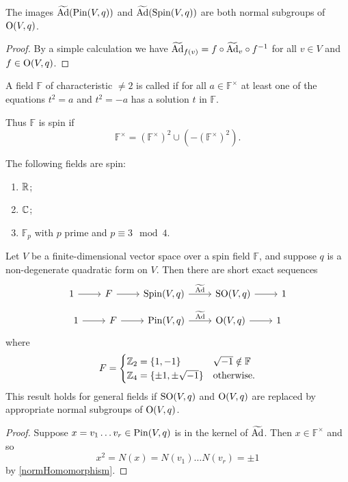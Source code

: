 \begin{proposition}
The images $\widetilde{\operatorname{Ad}}(\operatorname{Pin}(V,q))$ and $\widetilde{\operatorname{Ad}}(\operatorname{Spin}(V,q))$ are both normal subgroups of $\operatorname{O}(V,q)$.
\end{proposition}
\begin{proof}
By a simple calculation we have $\widetilde{\operatorname{Ad}}_{f(v)} = f\circ\widetilde{\operatorname{Ad}}_v\circ f^{-1}$ for all $v \in V$ and $f\in\operatorname{O}(V,q)$.
\end{proof}

\begin{definition}
A field $\mathbb{F}$ of characteristic $\neq 2$ is called  if for all $a\in \mathbb{F}^\times$ at least one of the equations $t^2 = a$ and $t^2 = -a$ has a solution $t$ in $\mathbb{F}$.
\end{definition}
Thus $\mathbb{F}$ is spin if
\[ \mathbb{F}^\times = (\mathbb{F}^\times)^2 \cup (-(\mathbb{F}^\times)^2). \]

\begin{lemma}
The following fields are spin:
\begin{enumerate}
\item $\mathbb{R}$;
\item $\mathbb{C}$;
\item $\mathbb{F}_p$ with $p$ prime and $p \equiv 3\mod 4$.
\end{enumerate}
\end{lemma}

\begin{theorem}
Let $V$ be a finite-dimensional vector space over a spin field
$\mathbb{F}$, and suppose $q$ is a non-degenerate quadratic form on $V$. Then there are
short exact sequences
\[ \begin{tikzcd}
1 \rar & F \rar & \Spin(V,q) \rar{\widetilde{\Ad}} & \SO(V,q) \rar & 1
\end{tikzcd} \]
\[ \begin{tikzcd}
1 \rar & F \rar & \Pin(V,q) \rar{\widetilde{\Ad}} & \Ogroup(V,q) \rar & 1
\end{tikzcd} \]
where
\[ F = \begin{cases}
\mathbb{Z}_2 = \{1,-1\} & \sqrt{-1}\notin\mathbb{F} \\
\mathbb{Z}_4 = \{\pm 1, \pm\sqrt{-1}\}	& \text{otherwise.}
\end{cases} \]
This result holds for general fields if $\operatorname{SO}(V,q)$ and $\operatorname{O}(V,q)$ are replaced by appropriate normal subgroups of $\operatorname{O}(V,q)$.
\end{theorem}
\begin{proof}
Suppose $x = v_1\ldots v_r\in\operatorname{Pin}(V,q)$ is in the kernel of $\widetilde{\operatorname{Ad}}$. Then $x\in \mathbb{F}^\times$ and so
\[ x^2 = N(x) = N(v_1)\ldots N(v_r) = \pm 1 \]
by \ref{normHomomorphism}.
\end{proof}

